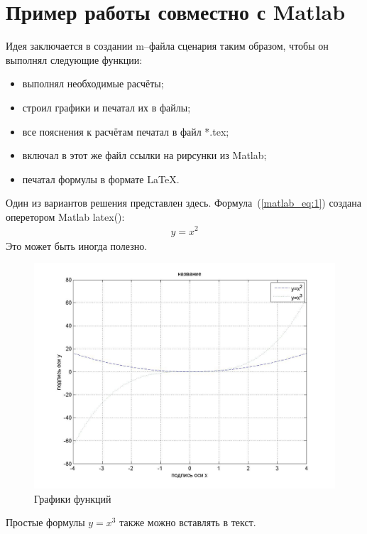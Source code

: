 \section{Пример работы совместно с Matlab} \label{app:matlab}

Идея заключается в создании m--файла сценария таким образом, чтобы он выполнял следующие функции:
\begin{itemize}
\item выполнял необходимые расчёты;
\item строил графики и печатал их в файлы;
\item все пояснения к расчётам печатал в файл *.tex;
\item включал в этот же файл ссылки на рирсунки из Matlab;
\item печатал формулы в формате LaTeX.
\end{itemize}

Один из вариантов решения представлен здесь.
Формула~(\ref{matlab_eq:1}) создана оперетором Matlab latex():
\begin{eqnarray}
y=x^2
\label{matlab_eq:1}
\end{eqnarray}
Это может быть иногда полезно.
\newpage

\begin{figure}[!h]\center
\captionsetup{singlelinecheck=true}
\includegraphics*[scale=0.4]{./about/matlab/matlab_figure_001}
\caption{Графики функций} \label{matlab_figure_001}
\end{figure}
\newpage
Простые формулы $y=x^3$ также можно вставлять в текст.

